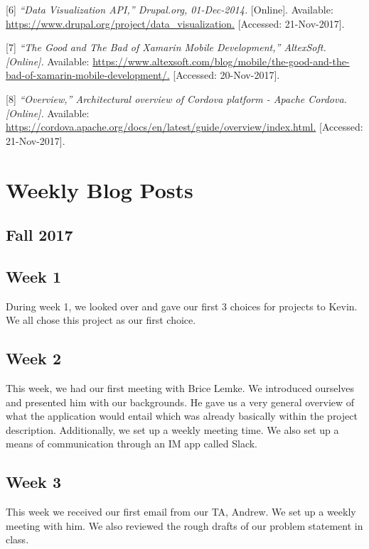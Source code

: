 \documentclass[onecolumn, draftclsnofoot,10pt, compsoc]{IEEEtran}
\begin{document}
[6] \textit{“Data Visualization API,” Drupal.org, 01-Dec-2014.} [Online]. Available: \url{https://www.drupal.org/project/data_visualization.} [Accessed: 21-Nov-2017].

[7] \textit{“The Good and The Bad of Xamarin Mobile Development,” AltexSoft. [Online].} Available: \url{https://www.altexsoft.com/blog/mobile/the-good-and-the-bad-of-xamarin-mobile-development/.} [Accessed: 20-Nov-2017].

[8] \textit{“Overview,” Architectural overview of Cordova platform - Apache Cordova. [Online].} Available: \url{https://cordova.apache.org/docs/en/latest/guide/overview/index.html.} [Accessed: 21-Nov-2017].







\section{Weekly Blog Posts} 

\subsection{Fall 2017} 
 \subsection{Week 1}
    During week 1, we looked over and gave our first 3 choices for projects to Kevin. We all chose this project as our first choice. 
    
    \subsection{Week 2}
    This week, we had our first meeting with Brice Lemke. We introduced ourselves and presented him with our backgrounds. He gave us a very general overview of what the application would entail which was already basically within the project description. Additionally, we set up a weekly meeting time. We also set up a means of communication through an IM app called Slack.
    
    \subsection{Week 3}
    This week we received our first email from our TA, Andrew. We set up a weekly meeting with him. We also reviewed the rough drafts of our problem statement in class.
    
\end{document}
